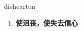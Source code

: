 
\begin{frame}
{\huge dishearten}
\begin{center}
\begin{enumerate}\Large
  \item \textbf{使沮丧，使失去信心}
\end{enumerate}
\end{center}
\end{frame}
